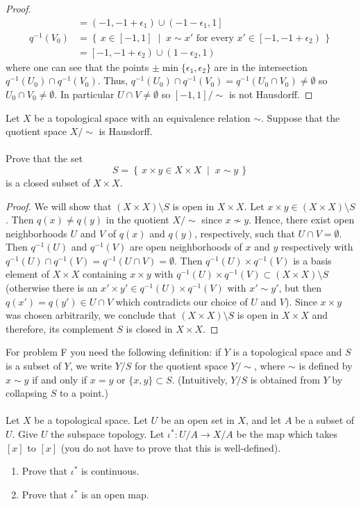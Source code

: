 \begin{proof}
\begin{align*}
&=\left(-1,-1+\epsilon_1\right)\cup\left(-1-\epsilon_1,1\right]\\
q^{-1}(V_0)&=\left\{\,x\in[-1,1]\;\middle|\;
\text{$x\sim x'$ for every $x'\in\left[-1,-1+\epsilon_2\right)$}\,\right\}\\
&=\left[-1,-1+\epsilon_2\right)\cup\left(1-\epsilon_2,1\right)
\end{align*}
where one can see that the points
$\pm\min\{\epsilon_1,\epsilon_2\}$ are in the intersection
$q^{-1}(U_0)\cap q^{-1}\left(V_0\right)$. Thus,
$q^{-1}\left(U_0\right)\cap q^{-1}(V_0)=q^{-1}\left(U_0\cap
  V_0\right)\neq\emptyset$ so $U_0\cap V_0\neq\emptyset$. In
particular $U\cap V\neq\emptyset$ so $[-1,1]/{\sim}$ is not
Hausdorff.
\end{proof}
\newpage
\begin{problem}[E]
Let $X$ be a topological space with an equivalence relation
$\sim$. Suppose that the quotient space $X/\sim$ is Hausdorff.
\\\\
Prove that the set
\[
S=\left\{\,x\times y\in X\times X\;\middle|\;x\sim y\,\right\}
\]
is a closed subset of $X\times X$.
\end{problem}
\begin{proof}
We will show that $(X\times X)\setminus S$ is open in $X\times
X$. Let $x\times y\in (X\times X)\setminus S$. Then $q(x)\neq
q(y)$ in the quotient $X/{\sim}$ since $x\nsim y$. Hence, there
exist open neighborhoods $U$ and $V$ of $q(x)$ and $q(y)$,
respectively, such that $U\cap V=\emptyset$. Then $q^{-1}(U)$ and
$q^{-1}(V)$ are open neighborhoods of $x$ and $y$ respectively
with $q^{-1}(U)\cap q^{-1}(V)=q^{-1}(U\cap V)=\emptyset$. Then
$q^{-1}(U)\times q^{-1}(V)$ is a basis element of $X\times X$
containing $x\times y$ with $q^{-1}(U)\times q^{-1}(V)\subset
(X\times X)\setminus S$ (otherwise there is an $x'\times y'\in
q^{-1}(U)\times q^{-1}(V)$ with $x'\sim y'$, but then
$q\left(x'\right)=q\left(y'\right)\in U\cap V$ which contradicts
our choice of $U$ and $V$). Since $x\times y$ was chosen
arbitrarily, we conclude that $(X\times X)\setminus S$ is open in
$X\times X$ and therefore, its complement $S$ is closed in
$X\times X$.
\end{proof}
\newpage
\begin{problem}[F]
For problem F you need the following definition: if $Y$ is a
topological space and $S$ is a subset of $Y$, we write $Y/S$ for
the quotient space $Y/{\sim}$, where $\sim$ is defined by $x\sim y$
if and only if $x=y$ or $\{x,y\}\subset S$. (Intuitively, $Y/S$
is obtained from $Y$ by collapsing $S$ to a point.)
\\\\
Let $X$ be a topological space. Let $U$ be an open set in $X$,
and let $A$ be a subset of $U$. Give $U$ the subspace
topology. Let $\iota^*\colon U/A\to X/A$ be the map which takes
$[x]$ to $[x]$ (you do not have to prove that this is
well-defined).
\begin{enumerate}[noitemsep,label=(\roman*)]
\item Prove that $\iota^*$ is continuous.
\item Prove that $\iota^*$ is an open map.
\end{enumerate}
\end{problem}
